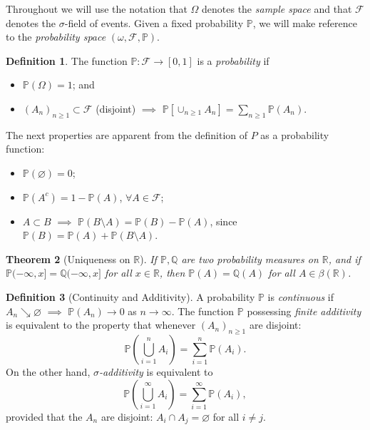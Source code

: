 \documentclass[12pt,reqno]{article}
\renewcommand{\emph}[1]{\textit{#1}}
\theoremstyle{plain}
\newtheorem{theorem}{Theorem}[section]
\theoremstyle{definition}
\newtheorem{definition}[theorem]{Definition}
\begin{document}
Throughout we will use the notation that $\Omega$ denotes the 
\emph{sample space} and that $\mathcal{F}$ denotes the $\sigma$-field of 
events. Given a fixed probability $\mathbb{P}$, we will make reference 
to the \emph{probability space} $(\omega, \mathcal{F}, \mathbb{P})$. 

\begin{definition} 
The function $\mathbb{P}: \mathcal{F} \rightarrow [0,1]$ is a 
\emph{probability} if 
\begin{itemize} 

\item $\mathbb{P}(\Omega) = 1$; and 
\item $(A_n)_{n \geq 1} \subset \mathcal{F}$ (disjoint) $\implies$ 
     $\mathbb{P}\left[\cup_{n \geq 1} A_n\right] = \sum_{n \geq 1} 
     \mathbb{P}(A_n)$. 

\end{itemize} 
\end{definition} 
The next properties are apparent from the definition of $P$ as a 
probability function:
\begin{itemize} 

\item $\mathbb{P}(\varnothing) = 0$; 
\item $\mathbb{P}(A^c) = 1 - \mathbb{P}(A)$, $\forall A \in \mathcal{F}$; 
\item $A \subset B$ $\implies$ $\mathbb{P}(B \setminus A) = 
     \mathbb{P}(B) - \mathbb{P}(A)$, since 
     $\mathbb{P}(B) = \mathbb{P}(A) + \mathbb{P}(B \setminus A)$. 

\end{itemize} 

\begin{theorem}[Uniqueness on $\mathbb{R}$]
If $\mathbb{P},\mathbb{Q}$ are two probability measures on $\mathbb{R}$, 
and if $\mathbb{P}(-\infty,x] = \mathbb{Q}(-\infty,x]$ for all 
$x \in \mathbb{R}$, then $\mathbb{P}(A) = \mathbb{Q}(A)$ for all 
$A \in \beta(\mathbb{R})$. 
\end{theorem} 

\begin{definition}[Continuity and Additivity]
A probability $\mathbb{P}$ is \emph{continuous} if 
$A_n \searrow \varnothing$ $\implies$ $\mathbb{P}(A_n) \rightarrow 0$ as 
$n \rightarrow \infty$. The function $\mathbb{P}$ possessing 
\emph{finite additivity} is equivalent to the property that whenever 
$(A_n)_{n \geq 1}$ are disjoint:
\[
\mathbb{P}\left(\bigcup_{i=1}^n A_i\right) = \sum_{i=1}^n \mathbb{P}(A_i). 
\]
On the other hand, \emph{$\sigma$-additivity} is equivalent to 
\[
\mathbb{P}\left(\bigcup_{i=1}^{\infty} A_i\right) = 
     \sum_{i=1}^{\infty} \mathbb{P}(A_i), 
\]
provided that the $A_n$ are disjoint: $A_i \cap A_j = \varnothing$ for all $i \neq j$. 
\end{definition} 
\end{document}
